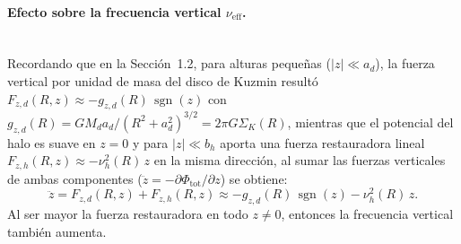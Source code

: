 \documentclass[11pt,letterpaper]{article}
\begin{document}
\paragraph{Efecto sobre la frecuencia vertical $\nu_{\mathrm{eff}}$.}
\mbox{}\\[0.4em]
Recordando que en la Sección~1.2, para alturas pequeñas ($|z| \ll a_d$), la fuerza vertical por unidad de masa del disco de Kuzmin resultó $F_{z,d}(R, z) \approx -g_{z,d}(R)\,\operatorname{sgn}(z)$ con $g_{z,d}(R) = GM_d a_d/(R^2 + a_d^2)^{3/2} = 2\pi G\Sigma_K(R)$, mientras que el potencial del halo es suave en $z = 0$ y para $|z| \ll b_h$ aporta una fuerza restauradora lineal $F_{z,h}(R, z) \approx -\nu_h^2(R)\,z$ en la misma dirección, al sumar las fuerzas verticales de ambas componentes ($\ddot{z} = -\partial\Phi_{\mathrm{tot}}/\partial z$) se obtiene:
\begin{equation}
    \ddot{z} = F_{z,d}(R, z) + F_{z,h}(R, z)
    \approx -g_{z,d}(R)\,\operatorname{sgn}(z) - \nu_h^2(R)\,z.
    \label{eq:z_ode_tot}
\end{equation}
Al ser mayor la fuerza restauradora en todo $z \neq 0$, entonces la frecuencia vertical también aumenta.
\end{document}
